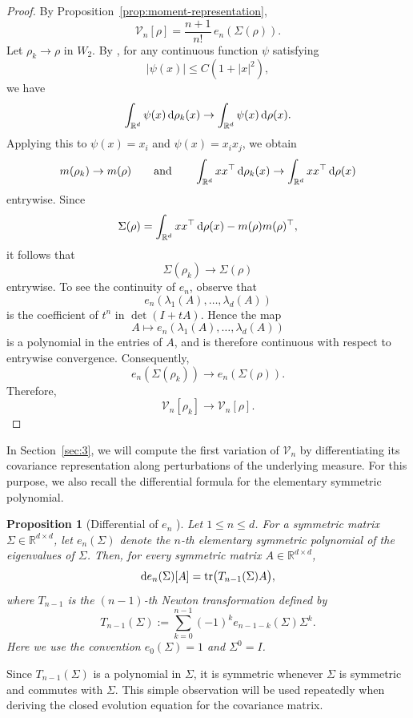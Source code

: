 \documentclass[11pt,reqno]{amsart}
\numberwithin{figure}{section}
\def\d {{\partial}}
\def\d{\mathrm{d}}
\renewcommand{\d}{  {\textup{d}} }
\newtheorem{proposition}{Proposition}[section]
\begin{document}
\begin{proof} 
By Proposition~\ref{prop:moment-representation}, \[ \mathcal V_n[\rho] = \frac{n+1}{n!}\,e_n(\Sigma(\rho)). \] 
Let $\rho_k\to\rho$ in $W_2$. By \cite[Theorem~6.9]{Vil}, for any continuous function $\psi$ satisfying 
\[ |\psi(x)|\le C(1+|x|^2), \] 
we have 
\[ \int_{\mathbb R^d}\psi(x)\,\d\rho_k(x)\to \int_{\mathbb R^d}\psi(x)\,\d\rho(x). \] 
Applying this to $\psi(x)=x_i$ and $\psi(x)=x_ix_j$, we obtain
\[ m(\rho_k)\to m(\rho) \qquad\text{and}\qquad \int_{\mathbb R^d}xx^\top\,\d\rho_k(x)\to \int_{\mathbb R^d}xx^\top\,\d\rho(x) \] 
entrywise. Since 
\[ \Sigma(\rho)=\int_{\mathbb R^d}xx^\top\,\d\rho(x)-m(\rho)m(\rho)^\top, \] 
it follows that \[ \Sigma(\rho_k)\to\Sigma(\rho) \] entrywise. To see the continuity of $e_n$, observe that 
\[ e_n(\lambda_1(A),\dots,\lambda_d(A)) \] 
is the coefficient of $t^n$ in $\det(I+tA)$. Hence the map 
\[ A\mapsto e_n(\lambda_1(A),\dots,\lambda_d(A)) \] 
is a polynomial in the entries of $A$, and is therefore continuous with respect to entrywise convergence. Consequently, \[ e_n(\Sigma(\rho_k))\to e_n(\Sigma(\rho)). \] 
Therefore, \[ \mathcal V_n[\rho_k]\to \mathcal V_n[\rho]. \] 
\end{proof}

In Section~\ref{sec:3}, we will compute the first variation of $\mathcal V_n$ by differentiating its covariance representation along perturbations of the underlying measure. For this purpose, we also recall the differential formula for the elementary symmetric polynomial.

\begin{proposition}[Differential of $e_n$ {\cite[equation (2.3)]{gursky2003fully}}]
	\label{prop:differential-en}
	Let $1\le n\le d$. For a symmetric matrix $\Sigma\in\mathbb R^{d\times d}$, let $e_n(\Sigma)$ denote the $n$-th elementary symmetric polynomial of the eigenvalues of $\Sigma$. Then, for every symmetric matrix $A\in\mathbb R^{d\times d}$,
	\[
	\d e_n(\Sigma)[A]
	=
	\operatorname{tr}\bigl(T_{n-1}(\Sigma)A\bigr),
	\]
	where $T_{n-1}$ is the $(n-1)$-th Newton transformation  defined by
	\[
	T_{n-1}(\Sigma)
	:=
	\sum_{k=0}^{n-1}(-1)^k e_{n-1-k}(\Sigma)\Sigma^k.
	\]
	Here we use the convention $e_0(\Sigma)=1$ and $\Sigma^0=I$.
\end{proposition}

Since $T_{n-1}(\Sigma)$ is a polynomial in $\Sigma$, it is symmetric whenever $\Sigma$ is symmetric and commutes with $\Sigma$. This simple observation will be used repeatedly when deriving the closed evolution equation for the covariance matrix.
\end{document}
